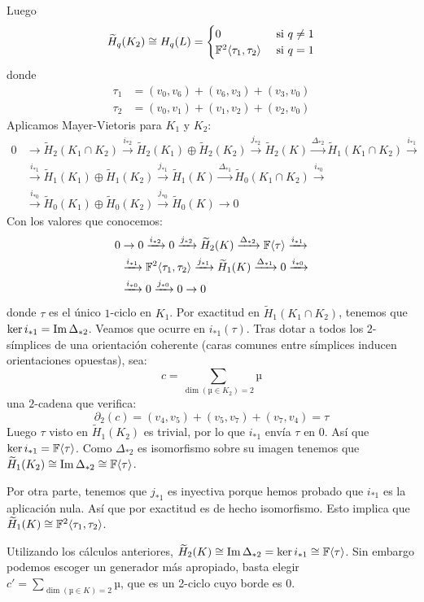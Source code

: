 \documentclass[HS.tex]{subfiles}
\begin{document}
\begin{ej}
\begin{figure}[H]
\end{figure}
Luego
\[ \widetilde{H}_q(K_2) \cong H_q(L) = \begin{cases}0 & \text{ si }q\neq 1\\\mathbb{F}^2\langle{\tau_1,\tau_2}\rangle & \text{ si }q=1\end{cases}\]
donde
\begin{align*}
\tau_1 & = (v_0,v_6)+(v_6,v_3)+(v_3,v_0)\\
\tau_2 & =(v_0,v_1)+(v_1,v_2)+(v_2,v_0)
\end{align*}
Aplicamos Mayer-Vietoris para $K_1$ y $K_2$:
\begin{align*}
0 & \to \widetilde{H}_2(K_1 \cap K_2) \xrightarrow{i_{*2}} \widetilde{H}_2(K_1)\oplus \widetilde{H}_2(K_2) \xrightarrow{j_{*2}} \widetilde{H}_2(K) \xrightarrow{\Delta_{*2}} \widetilde{H}_1(K_1 \cap K_2) \xrightarrow{i_{*1}}\\
& \xrightarrow{i_{*1}} \widetilde{H}_1(K_1)\oplus \widetilde{H}_1(K_2) \xrightarrow{j_{*1}} \widetilde{H}_1(K) \xrightarrow{\Delta_{*1}} \widetilde{H}_0(K_1 \cap K_2) \xrightarrow{i_{*0}}\\
& \xrightarrow{i_{*0}} \widetilde{H}_0(K_1)\oplus \widetilde{H}_0(K_2) \xrightarrow{j_{*0}} \widetilde{H}_0(K) \to 0
\end{align*}
Con los valores que conocemos:
\begin{align*}
0 & \to 0 \xrightarrow{i_{*2}} 0 \xrightarrow{j_{*2}} \widetilde{H}_2(K) \xrightarrow{\Delta_{*2}} \mathbb{F}\langle{\tau}\rangle \xrightarrow{i_{*1}}\\
& \xrightarrow{i_{*1}} \mathbb{F}^2\langle{\tau_1,\tau_2}\rangle \xrightarrow{j_{*1}} \widetilde{H}_1(K) \xrightarrow{\Delta_{*1}} 0 \xrightarrow{i_{*0}}\\
& \xrightarrow{i_{*0}} 0 \xrightarrow{j_{*0}} 0 \to 0
\end{align*}
donde $\tau$ es el único $1$-ciclo en $K_1$.
Por exactitud en $\widetilde{H}_1(K_1 \cap K_2)$, tenemos que $\ker i_{*1} = \operatorname{Im} \Delta_{*2}$.
Veamos que ocurre en $i_{*1}(\tau)$.
Tras dotar a todos los $2$-símplices de una orientación coherente (caras comunes entre símplices inducen orientaciones opuestas), sea:
\[ c = \sum_{\dim(µ \in K_2)=2} µ \]
una $2$-cadena que verifica:
\[ \partial_2(c) = (v_4,v_5)+(v_5,v_7)+(v_7,v_4) = \tau \]
Luego $\tau$ visto en $\widetilde{H}_1(K_2)$ es trivial, por lo que $i_{*1}$ envía $\tau$ en $0$. Así que $\ker i_{*1}=\mathbb{F}\langle{\tau}\rangle$. Como $\Delta_{*2}$ es isomorfismo sobre su imagen tenemos que $\widetilde{H}_1(K_2)\cong \operatorname{Im}\Delta_{*2}\cong \mathbb{F}\langle{\tau}\rangle$.

Por otra parte, tenemos que $j_{*1}$ es inyectiva porque hemos probado que $i_{*1}$ es la aplicación nula. Así que por exactitud es de hecho isomorfismo. Esto implica que $\widetilde{H}_1(K)\cong \mathbb{F}^2\langle{\tau_1,\tau_2}\rangle$.

Utilizando los cálculos anteriores, $\widetilde{H}_2(K)\cong\operatorname{Im}\Delta_{*2}=\ker{i_{*1}}\cong\mathbb{F}\langle{\tau}\rangle$. Sin embargo podemos escoger un generador más apropiado, basta elegir $c' = \sum_{\dim(µ \in K)=2} µ $, que es un 2-ciclo cuyo borde es 0. 
\end{ej}
\end{document}

